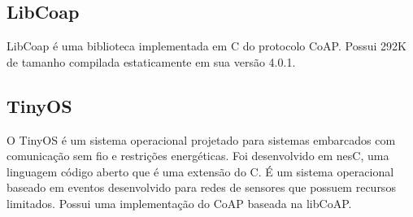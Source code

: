 \subsection{LibCoap}
LibCoap \'e uma biblioteca implementada em C do protocolo CoAP. Possui 292K de tamanho compilada estaticamente em sua vers\~ao 4.0.1.


\subsection{TinyOS}
O TinyOS \'e um sistema operacional projetado para sistemas embarcados com comunica\c{c}\~ao sem fio e restri\c{c}\~oes energ\'eticas. Foi desenvolvido em nesC, uma linguagem c\'odigo aberto que \'e uma extens\~ao do C. \'E um sistema operacional baseado em eventos desenvolvido para redes de sensores que possuem recursos limitados. Possui uma implementa\c{c}\~ao do CoAP baseada na libCoAP.
